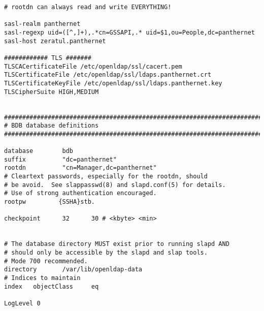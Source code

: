 \begin{Verbatim}
# rootdn can always read and write EVERYTHING!

sasl-realm panthernet
sasl-regexp uid=([^,]+),.*cn=GSSAPI,.* uid=$1,ou=People,dc=panthernet
sasl-host zeratul.panthernet

############ TLS #######
TLSCACertificateFile /etc/openldap/ssl/cacert.pem
TLSCertificateFile /etc/openldap/ssl/ldaps.panthernet.crt
TLSCertificateKeyFile /etc/openldap/ssl/ldaps.panthernet.key
TLSCipherSuite HIGH,MEDIUM


#######################################################################
# BDB database definitions
#######################################################################

database        bdb
suffix          "dc=panthernet"
rootdn          "cn=Manager,dc=panthernet"
# Cleartext passwords, especially for the rootdn, should
# be avoid.  See slappasswd(8) and slapd.conf(5) for details.
# Use of strong authentication encouraged.
rootpw         {SSHA}stb.

checkpoint      32      30 # <kbyte> <min>


# The database directory MUST exist prior to running slapd AND
# should only be accessible by the slapd and slap tools.
# Mode 700 recommended.
directory       /var/lib/openldap-data
# Indices to maintain
index   objectClass     eq

LogLevel 0
\end{Verbatim}



